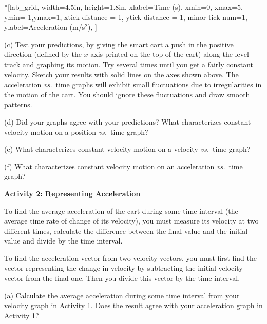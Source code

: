 \begin{lab_axis}*[lab_grid,
	width=4.5in, height=1.8in,
	xlabel={Time (s)},
	xmin=0, xmax=5,
	ymin=-1,ymax=1, 
	xtick distance = 1, 
	ytick distance = 1, 
	minor tick num=1,
	ylabel={Acceleration (m/s$^2$)},
	]
\end{lab_axis}


(c) Test your predictions, by giving the smart cart a push in the positive direction (defined by the $x$-axis printed on the top of the cart) along the level track and graphing its motion. Try several times until you get a fairly constant velocity. Sketch your results with solid lines on the axes shown above. The acceleration \textit{vs.}~time graphs will exhibit small fluctuations due to irregularities in the motion of the cart. You should ignore these fluctuations and draw smooth
patterns.
\answerspace{0.2in}

\pagebreak[2]
(d) Did your graphs agree with your predictions? What characterizes constant
velocity motion on a position \textit{vs.}~time graph? 
\answerspace{10mm}

(e) What characterizes constant velocity motion on a velocity \textit{vs.}~time graph?
\answerspace{10mm}

(f) What characterizes constant velocity motion on an acceleration \textit{vs.}~time graph?
\answerspace{10mm}

\textbf{Activity 2: Representing Acceleration} 

To find the average acceleration of the cart during some time interval (the
average time rate of change of its velocity), you must measure its velocity
at two different times, calculate the difference between the final value and
the initial value and divide by the time interval.

To find the acceleration vector from two velocity vectors, you must first find
the vector representing the change in velocity by subtracting the initial velocity
vector from the final one. Then you divide this vector by the time interval. 

(a) Calculate the average acceleration during some time interval from your velocity graph in Activity 1.  Does the result agree with your acceleration graph in Activity 1?
\answerspace{20mm}


